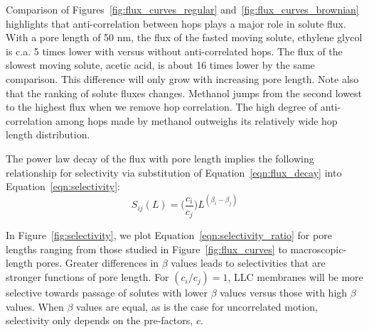 \documentclass{article}
\begin{document}
  
  Comparison of Figures~\ref{fig:flux_curves_regular} and~\ref{fig:flux_curves_brownian}
  highlights that anti-correlation between hops plays a major role in solute flux.
  With a pore length of 50 nm, the flux of the fasted moving solute, ethylene glycol is 
  c.a. 5 times lower with versus without anti-correlated hops. The flux of the slowest
  moving solute, acetic acid, is about 16 times lower by the same comparison. This 
  difference will only grow with increasing pore length. Note also that the ranking
  of solute fluxes changes. Methanol jumps from the second lowest to the highest
  flux when we remove hop correlation. The high degree of anti-correlation among
  hops made by methanol outweighs its relatively wide hop length distribution.
  


  
  The power law decay of the flux with pore length implies the following relationship
  for selectivity via substitution of Equation~\ref{eqn:flux_decay} into 
  Equation~\ref{eqn:selectivity}:
  \begin{equation}
  S_{ij}(L) = \bigg(\frac{c_i}{c_j}\bigg)L^{(\beta_i - \beta_j)}
  \label{eqn:selectivity_ratio}
  \end{equation}
  
  In Figure~\ref{fig:selectivity}, we plot Equation~\ref{eqn:selectivity_ratio} for pore
  lengths ranging from those studied in Figure~\ref{fig:flux_curves} to macroscopic-length
  pores. Greater differences in $\beta$ values leads to selectivities that are stronger 
  functions of pore length. For $(c_i / c_j)=1$, LLC membranes will be more selective
  towards passage of solutes with lower $\beta$ values versus those with high $\beta$ values.
  When $\beta$ values are equal, as is the case for uncorrelated motion, selectivity only
  depends on the pre-factors, $c$. 
\end{document}
